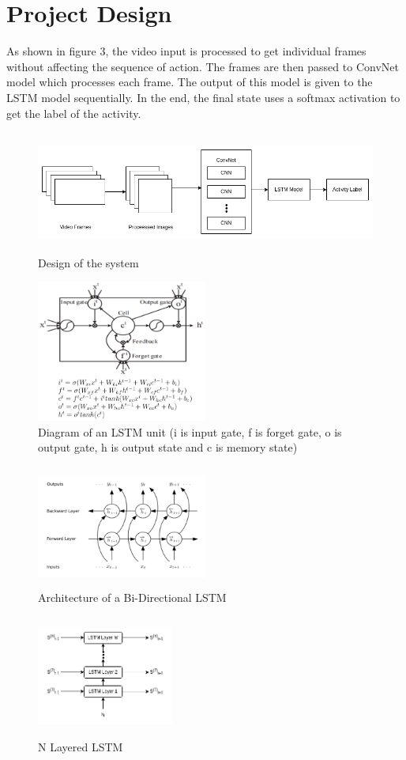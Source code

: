 \documentclass[twocolumn]{article}
\begin{document}
\section {Project Design}
As shown in figure 3, the video input is processed to get individual frames without affecting the sequence of action. The frames are then passed to ConvNet model which processes each frame. The output of this model is given to the LSTM model sequentially. In the end, the final state uses a softmax activation to get the label of the activity.
\begin{figure}[h]
    \includegraphics[width=\textwidth,height=4cm]{architecture.png}
    \caption{Design of the system}
\end{figure}
\begin{figure}
    \includegraphics[width=0.5\textwidth]{LSTM Cell.png}
    \caption{Diagram of an LSTM unit (i is input gate, f is forget gate, o is output gate, h is output state and c is memory state) \cite{b3}}
\end{figure}
\begin{figure}
    \includegraphics[width=0.5\textwidth,height=4cm]{BiLSTM.png}
    \caption{Architecture of a Bi-Directional LSTM \cite{b3}}
\end{figure}
\begin{figure}
    \center
    \includegraphics[width=0.4\textwidth,height=4cm]{Layered LSTM.drawio.png}
    \caption{N Layered LSTM}
    \center
\end{figure}
\end{document}
